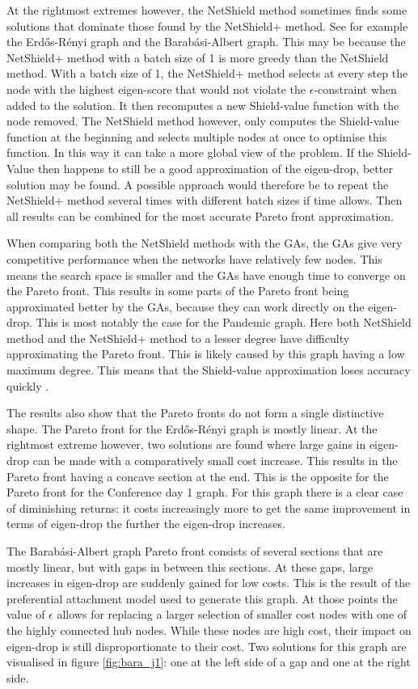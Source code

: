 \documentclass{svproc}
\begin{document}
At the rightmost extremes however, the NetShield method sometimes finds some solutions that dominate those found by the NetShield+ method. See for example the Erd\H{o}s-R\'enyi graph and the Barab\'asi-Albert graph. This may be because the NetShield+ method with a batch size of 1 is more greedy than the NetShield method. With a batch size of 1, the NetShield+ method selects at every step the node with the highest eigen-score that would not violate the $\epsilon$-constraint when added to the solution. It then recomputes a new Shield-value function with the node removed. The NetShield method however, only computes the Shield-value function at the beginning and selects multiple nodes at once to optimise this function. In this way it can take a more global view of the problem. If the Shield-Value then happens to still be a good approximation of the eigen-drop, better solution may be found. A possible approach would therefore be to repeat the NetShield+ method several times with different batch sizes if time allows. Then all results can be combined for the most accurate Pareto front approximation.

When comparing both the NetShield methods with the GAs, the GAs give very competitive performance when the networks have relatively few nodes. This means the search space is smaller and the GAs have enough time to converge on the Pareto front. This results in some parts of the Pareto front being approximated better by the GAs, because they can work directly on the eigen-drop. This is most notably the case for the Pandemic graph. Here both NetShield method and the NetShield+ method to a lesser degree have difficulty approximating the Pareto front. This is likely caused by this graph having a low maximum degree. This means that the Shield-value approximation loses accuracy quickly \cite{chen2016node}.

The results also show that the Pareto fronts do not form a single distinctive shape. The Pareto front for the Erd\H{o}s-R\'enyi graph is mostly linear. At the rightmost extreme however, two solutions are found where large gains in eigen-drop can be made with a comparatively small cost increase. This results in the Pareto front having a concave section at the end. This is the opposite for the Pareto front for the Conference day 1 graph. For this graph there is a clear case of diminishing returns: it costs increasingly more to get the same improvement in terms of eigen-drop the further the eigen-drop increases.

The Barab\'asi-Albert graph Pareto front consists of several sections that are mostly linear, but with gaps in between this sections. At these gaps, large increases in eigen-drop are suddenly gained for low costs. This is the result of the preferential attachment model used to generate this graph. At those points the value of $\epsilon$ allows for replacing a larger selection of smaller cost nodes with one of the highly connected hub nodes. While these nodes are high cost, their impact on eigen-drop is still disproportionate to their cost. Two solutions for this graph are visualised in figure \ref{fig:bara_j1}: one at the left side of a gap and one at the right side.
\end{document}
